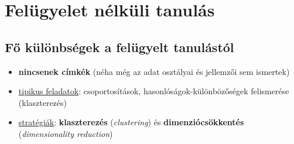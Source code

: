 \documentclass[a4paper, 11pt]{article}
\begin{document}
\newpage

\iffalse
\begin{itemize}
	\item 1. hf (10 pont): pályázatot csináljunk -- Unseen places; válassunk egy tetszőleges képgenerátor programot, 10-9-8-7 pont helyezéstől függően
	\item az emberiség nem készült fel egy ilyen erős MI használatára
	\item generatív mechanizmus: generátor -- diszkriminátor modell (volt korábban)
	\item más MI, ugyanaz a probléma: internetre kiengedve hamar rasszistává vált a ChatGPT $\to$ ki a felelősérte? a cég? a termék? kit lehet felelősségre vonni?
	\item első MI, amivel az ember találkozott: sütik a weblapokon, social media (adatgyűjtés, amit ellenünk használtunk fel) $\to$ profilozás megindult, csoportra szabott reklámok $\to$ csomó új negatív káros hatás jelent meg, ami ránk is hatássak van $\to$ adatalapú engagement maximalisation
	\item második találkozás az MI-vel: generatív MI; egészen 2017-ig megszabott területeken lehetett hozzáférni
	\item 2017: transzformer modell; mely után $\to$ nyelvfeldolgozás, generatív nagy multimodális nyelvi modellek (generative large language multimodal models)
	\item második hf: honnan tudjuk, h jó választ kapunk a chatgpt-től, ha nincs szakértelmünk a témáról?: keressünk hibát chatgpt-ben. nincs benne általános intelligencia
\end{itemize}
\fi

\newpage

\section{Felügyelet nélküli tanulás}

\subsection{Fő különbségek a felügyelt tanulástól}

\begin{itemize}
	\item \textbf{nincsenek címkék} (néha még az adat osztályai és jellemzői sem ismertek)
	\item \underline{tipikus feladatok}: csoportosítások, hasonlóságok-különbözőségek felismerése (klaszterezés)
	\item \underline{stratégiák}: \textbf{klaszterezés} (\textit{clustering}) és \textbf{dimenziócsökkentés} (\textit{dimensionality reduction})
\end{itemize}
\end{document}

